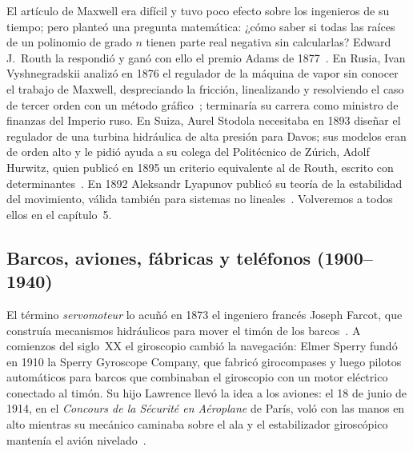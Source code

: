 El artículo de Maxwell era difícil y tuvo poco efecto sobre los ingenieros de su tiempo; pero planteó una pregunta matemática: ¿cómo saber si todas las raíces de un polinomio de grado $n$ tienen parte real negativa sin calcularlas? Edward J.\ Routh la respondió y ganó con ello el premio Adams de 1877~\citep{Rou77}. En Rusia, Ivan Vyshnegradskii analizó en 1876 el regulador de la máquina de vapor sin conocer el trabajo de Maxwell, despreciando la fricción, linealizando y resolviendo el caso de tercer orden con un método gráfico~\citep{Vys76}; terminaría su carrera como ministro de finanzas del Imperio ruso. En Suiza, Aurel Stodola necesitaba en 1893 diseñar el regulador de una turbina hidráulica de alta presión para Davos; sus modelos eran de orden alto y le pidió ayuda a su colega del Politécnico de Zúrich, Adolf Hurwitz, quien publicó en 1895 un criterio equivalente al de Routh, escrito con determinantes~\citep{Bis89,Hur95}. En 1892 Aleksandr Lyapunov publicó su teoría de la estabilidad del movimiento, válida también para sistemas no lineales~\citep{Lya92}. Volveremos a todos ellos en el capítulo~5.

\subsection{Barcos, aviones, fábricas y teléfonos (1900--1940)}

El término \emph{servomoteur} lo acuñó en 1873 el ingeniero francés Joseph Farcot, que construía mecanismos hidráulicos para mover el timón de los barcos~\citep{Bis09}. A comienzos del siglo~XX el giroscopio cambió la navegación: Elmer Sperry fundó en 1910 la Sperry Gyroscope Company, que fabricó girocompases y luego pilotos automáticos para barcos que combinaban el giroscopio con un motor eléctrico conectado al timón. Su hijo Lawrence llevó la idea a los aviones: el 18 de junio de 1914, en el \emph{Concours de la Sécurité en Aéroplane} de París, voló con las manos en alto mientras su mecánico caminaba sobre el ala y el estabilizador giroscópico mantenía el avión nivelado~\citep{Bis09}.

